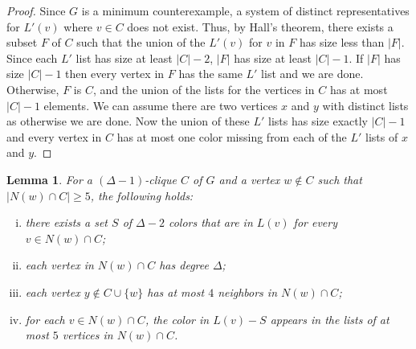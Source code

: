 \documentclass[12pt]{article}
\newtheorem{lemma}[theorem]{Lemma}
\theoremstyle{definition}
\begin{document}
\begin{proof}
Since $G$ is a minimum counterexample, a system of distinct representatives for $L'(v)$ where $v\in C$ does not exist. 
Thus, by Hall's theorem, there exists a subset $F$ of $C$ such that the union of the $L'(v)$ for $v$ in $F$ has size less than $|F|$.
Since each $L'$ list has size at least $|C|-2$, $|F|$ has size at least $|C|-1$.
If $|F|$ has size $|C|-1$ then every vertex in $F$ has the same $L'$ list and we are done.
Otherwise, $F$ is $C$, and the union of the lists for the vertices in $C$ has at most $|C|-1$ elements.   
We can assume there are two vertices $x$ and $y$ with distinct lists as otherwise we are done. 
Now the union of these $L'$ lists has size exactly $|C|-1$ and every vertex in $C$ has at most one color missing from each of the $L'$ lists of $x$ and $y$. 
\end{proof}

\begin{lemma}\label{theLemma}
For a $(\Delta-1)$-clique $C$ of $G$ and a vertex $w\not\in C$ such that $|N(w)\cap C|\geq 5$,
the following holds:
\begin{enumerate}[(i)]
\item there exists a set $S$ of $\Delta-2$ colors that are in $L(v)$ for every $v\in N(w)\cap C$;
\item each vertex in $N(w)\cap C$ has degree $\Delta$;
\item each vertex $y\not\in C\cup\{w\}$ has at most $4$ neighbors in $N(w)\cap C$;
\item for each $v\in N(w)\cap C$, the color in $L(v)-S$ appears in the lists of at most $5$ vertices in $N(w)\cap C$.
\end{enumerate}
\end{lemma}
\end{document}
